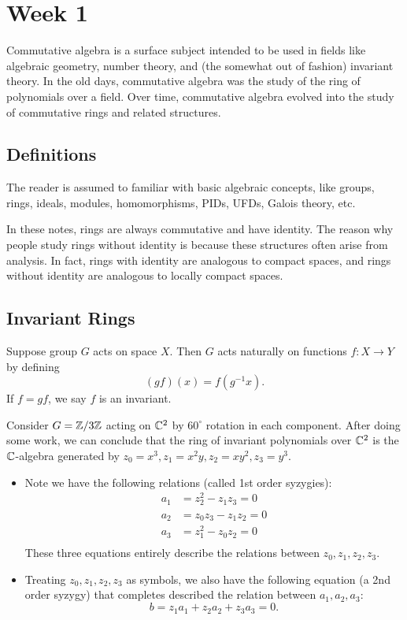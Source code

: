 \section{Week 1}
Commutative algebra is a surface subject intended to be used in fields like algebraic geometry, number theory, and (the somewhat out of fashion) invariant theory. In the old days, commutative algebra was the study of the ring of polynomials over a field. Over time, commutative algebra evolved into the study of commutative rings and related structures.

\subsection{Definitions}
The reader is assumed to familiar with basic algebraic concepts, like groups, rings, ideals, modules, homomorphisms, PIDs, UFDs, Galois theory, etc.

In these notes, rings are always commutative and have identity. The reason why people study rings without identity is because these structures often arise from analysis. In fact, rings with identity are analogous to compact spaces, and rings without identity are analogous to locally compact spaces.

\subsection{Invariant Rings}
Suppose group $G$ acts on space $X$. Then $G$ acts naturally on functions $f: X \to Y$ by defining
\[
    (gf)(x) = f(g^{-1}x).
\]
If $f = gf$, we say $f$ is an invariant.

Consider $G = {\mathbb Z}/3{\mathbb Z}$ acting on ${\mathbb C}^2$ by $60^{\circ}$ rotation in each component. After doing some work, we can conclude that the ring of invariant polynomials over ${\mathbb C}^2$ is the ${\mathbb C}$-algebra generated by $z_0 = x^3, z_1 = x^2y, z_2 = xy^2, z_3 = y^3$.
\begin{itemize}
    \item Note we have the following relations (called 1st order syzygies):
    \[
        \begin{split}
            a_1 &= z_2^2 - z_1z_3 = 0\\
            a_2 &= z_0z_3 - z_1z_2 = 0\\
            a_3 &= z_1^2 - z_0z_2 = 0\\
        \end{split}
    \]
    These three equations entirely describe the relations between $z_0, z_1, z_2, z_3$.
    \item Treating $z_0, z_1, z_2, z_3$ as symbols, we also have the following equation (a 2nd order syzygy) that completes described the relation between $a_1, a_2, a_3$:
    \[
        b = z_1a_1 + z_2a_2 + z_3a_3 = 0.
    \]
\end{itemize}

